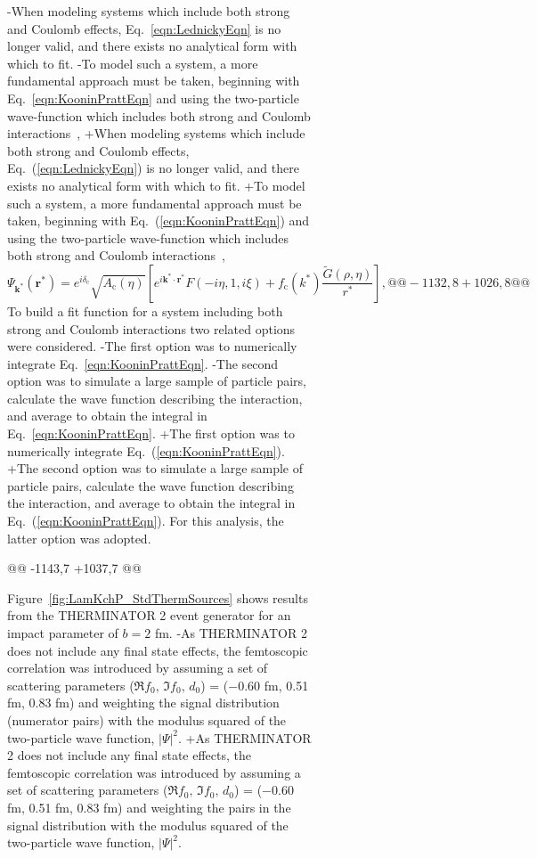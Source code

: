 \begin{table}[htbp]
\begin{figure}[h]
{\begin{figure}[h!]
{-When modeling systems which include both strong and Coulomb effects, Eq.~\ref{eqn:LednickyEqn} is no longer valid, and there exists no analytical form with which to fit.
-To model such a system, a more fundamental approach must be taken, beginning with Eq.~\ref{eqn:KooninPrattEqn} and using the two-particle wave-function which includes both strong and Coulomb interactions~\cite{Lednicky:2005tb},
+When modeling systems which include both strong and Coulomb effects, Eq.~(\ref{eqn:LednickyEqn}) is no longer valid, and there exists no analytical form with which to fit.
+To model such a system, a more fundamental approach must be taken, beginning with Eq.~(\ref{eqn:KooninPrattEqn}) and using the two-particle wave-function which includes both strong and Coulomb interactions~\cite{Lednicky:2005tb},
 \begin{equation}
  \Psi_{\mathbf{k^{*}}}(\mathbf{r^{*}}) = e^{i\delta_{\mathrm{c}}}\sqrt{A_{\mathrm{c}}(\eta)}[e^{i\mathbf{k^{*}} \cdot \mathbf{r^{*}}}F(-i\eta,1,i\xi) + f_{\mathrm{c}}(k^{*})\frac{\tilde{G}(\rho,\eta)}{r^{*}}],
 \label{eqn:CoulombWaveFcn}
@@ -1132,8 +1026,8 @@
 \label{eqn:GenCfEqnwLambda}
 \end{equation}
 To build a fit function for a system including both strong and Coulomb interactions two related options were considered. 
-The first option was to numerically integrate Eq.~\ref{eqn:KooninPrattEqn}.  
-The second option was to simulate a large sample of particle pairs, calculate the wave function describing the interaction, and average to obtain the integral in Eq.~\ref{eqn:KooninPrattEqn}. 
+The first option was to numerically integrate Eq.~(\ref{eqn:KooninPrattEqn}).  
+The second option was to simulate a large sample of particle pairs, calculate the wave function describing the interaction, and average to obtain the integral in Eq.~(\ref{eqn:KooninPrattEqn}). 
 For this analysis, the latter option was adopted.
 
 
@@ -1143,7 +1037,7 @@
 \label{App:THERM}
 
 Figure~\ref{fig:LamKchP_StdThermSources} shows \LamKchP results from the THERMINATOR 2 event generator for an impact parameter of $b = 2$ fm.
-As THERMINATOR 2 does not include any final state effects, the femtoscopic correlation was introduced by assuming a set of scattering parameters ($\Re f_{0},\, \Im f_{0},\, d_{0}$) = ($-$0.60 fm, 0.51 fm, 0.83 fm) and weighting the signal distribution (numerator pairs) with the modulus squared of the two-particle wave function, $|\Psi|^{2}$.
+As THERMINATOR 2 does not include any final state effects, the femtoscopic correlation was introduced by assuming a set of scattering parameters ($\Re f_{0},\, \Im f_{0},\, d_{0}$) = ($-$0.60 fm, 0.51 fm, 0.83 fm) and weighting the pairs in the signal distribution with the modulus squared of the two-particle wave function, $|\Psi|^{2}$.
 
}
\end{figure}}
\end{figure}
\end{table}
